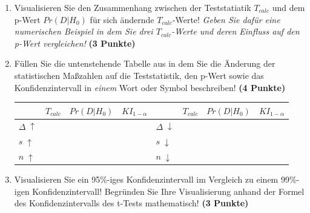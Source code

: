 \documentclass[a4paper, 9pt]{scrartcl}\usepackage[]{graphicx}\usepackage[]{xcolor}
\begin{document}
\begin{enumerate}
\item Visualisieren Sie den Zusammenhang zwischen der Teststatiatik
  $T_{calc}$ und dem p-Wert $Pr(D|H_0)$ f{\"u}r sich {\"a}ndernde $T_{calc}$-Werte!
  \textit{Geben Sie daf{\"u}r eine numerischen Beispiel in dem Sie drei
    $T_{calc}$-Werte und deren Einfluss auf den p-Wert vergleichen!}
  \textbf{(3 Punkte)}  
\item  F{\"u}llen Sie die untenstehende Tabelle aus in dem Sie die {\"A}nderung der
  statistischen Ma{\ss}zahlen auf die Teststatistik, den p-Wert sowie das
  Konfidenzintervall in \textit{einem} Wort oder Symbol beschreiben! \textbf{(4 Punkte)}
\begin{center}
  \large
  \begin{tabular}[c]{l|c|c|c|l|c|c|c}
    & $T_{calc}$ & $Pr(D|H_0)$ & $KI_{1-\alpha}$ & & $T_{calc}$ & $Pr(D|H_0)$ & $KI_{1-\alpha}$\strut\\ 
    \hline
    \textbf{$\Delta\; \uparrow$} & \hspace{1.8cm} & \hspace{1.8cm}  & \hspace{1.8cm} & \textbf{
                                                          $\Delta\; \downarrow$} &
                                                                          \hspace{1.8cm} & \hspace{1.8cm}  & \hspace{1.8cm}\strut\\
    \hline
        \textbf{$s\; \uparrow$} & \hspace{1.8cm} & \hspace{1.8cm}  & \hspace{1.8cm} & \textbf{
                                                          $s\; \downarrow$} &
                                                                          \hspace{1.8cm}
                                                & \hspace{1.8cm}  & \hspace{1.8cm}\strut\\
    \hline
        \textbf{$n\; \uparrow$} & \hspace{1.8cm} & \hspace{1.8cm}  & \hspace{1.8cm} & \textbf{
                                                          $n\; \downarrow$} &
                                                                          \hspace{1.8cm}
                                                & \hspace{1.8cm}  & \hspace{1.8cm}\strut\\
    \hline
  \end{tabular}
\end{center}
\item Visualisieren Sie ein 95\%-iges Konfidenzintervall im Vergleich
  zu einem 99\%-igen Konfidenzintervall! Begr{\"u}nden Sie Ihre Visualisierung anhand der Formel
  des Konfidenzintervalls des t-Tests mathematisch! \textbf{(3 Punkte)} 
\end{enumerate} 
\end{document}
